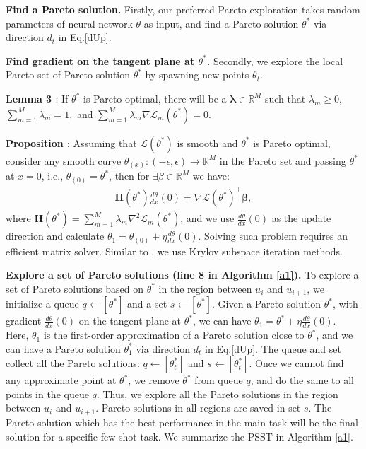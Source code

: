 \documentclass[final]{cvpr}
\begin{document}
\textbf{Find a Pareto solution.}
Firstly, 
our preferred Pareto exploration takes random parameters of neural network $\theta$ as input, and find a Pareto solution $\theta^*$ via direction $d_t$ in Eq.\ref{dUp}.

\textbf{Find gradient on the tangent plane at $\theta^*$. } 
Secondly, we explore the local Pareto set of Pareto solution $\theta^*$ 
by spawning new points $\theta_t$. 

\textbf{Lemma 3 \cite{hillermeier2001nonlinear}}: If $\theta^*$ is Pareto optimal, there will be a $\boldsymbol{\lambda} \in \mathbb{R}^{M}$ such that $\lambda_{m} \geq 0$, $\sum_{m=1}^{M} \lambda_{m}=1,$ and $\sum_{m=1}^{M} \lambda_{m} \nabla \mathcal L_{m}(\theta^*)={0}$. 

\textbf{Proposition \cite{hillermeier2001generalized}}: Assuming that $ \mathcal{L}\left(\theta^*\right)$
is smooth and $\theta^*$ is Pareto optimal, consider any smooth
curve ${\theta}_{(x)}:(-\epsilon, \epsilon) \rightarrow \mathbb{R}^{M}$ in the Pareto set and passing $\theta^*$ at $x = 0$, i.e., ${\theta}_{(0)}={\theta}^{*}$, then for $\exists \beta \in \mathbb{R}^{M}$ we have:
\begin{equation}
\begin{array}{cc}
\boldsymbol{H}\left(\theta^*\right) \frac{d\theta}{dx}(0)=\nabla \mathcal{L}\left(\theta^* \right)^{\top} \boldsymbol{\beta},
\end{array}
\end{equation}
where
$\boldsymbol{H}\left(\theta^*\right)=\sum_{m=1}^{M} \lambda_{m} \nabla^{2} \mathcal{L}_{m}\left(\theta^*\right)$,
and we use $\frac{d\theta}{dx}(0)$ as the update direction and calculate $\theta_{1} = \theta_{(0)} + \eta \frac{d\theta}{dx}(0)$. 
Solving such problem requires an efficient matrix solver. Similar to \cite{ma2020continuous}, we use Krylov subspace iteration methods. 
 

\textbf{Explore a set of Pareto solutions (line 8 in Algorithm \ref{a1}).}
To explore a set of Pareto solutions based on $\theta^*$ in the region between $u_i$ and $u_{i+1}$, we initialize a queue $q \leftarrow\left[\theta^*\right]$ and a set $s\leftarrow\left[\theta^*\right]$.
Given a Pareto solution $\theta^*$, with gradient $\frac{d\theta}{dx}(0)$ on the tangent plane at $\theta^*$, we can have $\theta_{1}=\theta^*+\eta \frac{d\theta}{dx}(0)$.
Here, $\theta_{1}$ is the first-order approximation of a Pareto solution close to $\theta^*$, and we can have a Pareto solution $\theta_{1}^*$ via direction $d_t$ in Eq.\ref{dUp}. 
The queue and set collect all the Pareto solutions: $q \leftarrow\left[\theta_{t}^*\right]$ and $s\leftarrow\left[\theta_{t}^*\right]$. 
Once we cannot find any approximate point at $\theta^*$, we remove $\theta^*$ from queue $q$, and do the same to all points in the queue $q$.
Thus, we explore all the Pareto solutions in the region between $u_i$ and $u_{i+1}$. Pareto solutions in all regions are saved in set $s$.
The Pareto solution which has the best performance in the main task will be the final solution for a specific few-shot task.
We summarize the PSST in Algorithm \ref{a1}.
\end{document}
